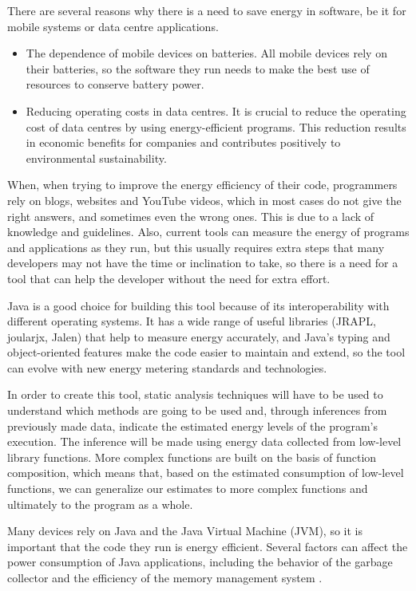 \documentclass[sigplan]{acmart}
\begin{document}
There are several reasons why there is a need to save energy in software, be it for mobile systems or data centre applications. \\

\begin{itemize}
  \item The dependence of mobile devices on batteries. All mobile devices rely on their batteries, so the software they run needs to make the best use of resources to conserve battery power.
  \item Reducing operating costs in data centres. It is crucial to reduce the operating cost of data centres by using energy-efficient programs. This reduction results in economic benefits for companies and contributes positively to environmental sustainability. \\
\end{itemize}

When, when trying to improve the energy efficiency of their code, programmers rely on blogs, websites and YouTube videos, which in most cases do not give the right answers, and sometimes even the wrong ones. This is due to a lack of knowledge and guidelines.
Also, current tools can measure the energy of programs and applications as they run, but this usually requires extra steps that many developers may not have the time or inclination to take, so there is a need for a tool that can help the developer without the need for extra effort\cite{10.1145/3154384}. 

Java is a good choice for building this tool because of its interoperability with different operating systems. It has a wide range of useful libraries (JRAPL, joularjx, Jalen) that help to measure energy accurately, and Java's typing and object-oriented features make the code easier to maintain and extend, so the tool can evolve with new energy metering standards and technologies. 

In order to create this tool, static analysis techniques will have to be used to understand which methods are going to be used and, through inferences from previously made data, indicate the estimated energy levels of the program's execution. The inference will be made using energy data collected from low-level library functions. More complex functions are built on the basis of function composition, which means that, based on the estimated consumption of low-level functions, we can generalize our estimates to more complex functions and ultimately to the program as a whole. 

Many devices rely on Java and the Java Virtual Machine (JVM), so it is important that the code they run is energy efficient. Several factors can affect the power consumption of Java applications, including the behavior of the garbage collector and the efficiency of the memory management system \cite{10.5555/1267847.1267870}. 
\end{document}
